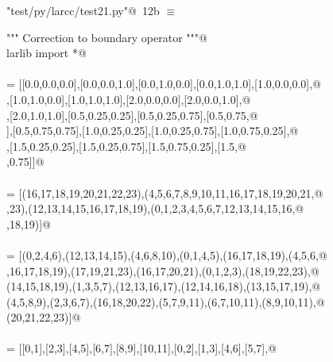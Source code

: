 \documentclass[11pt,oneside]{article}    %
\begin{document}
\begin{flushleft} \small \label{scrap21}
\protect{}\verb@"test/py/larcc/test21.py"@\nobreak\ {\footnotesize 12b }$\equiv$
\vspace{-1ex}
\begin{list}{}{} \item
\mbox{}\verb@""" Correction to boundary operator """@\\
\mbox{}\verb@from larlib import *@\\
\mbox{}\verb@@\\
\mbox{}\verb@V = [[0.0,0.0,0.0],[0.0,0.0,1.0],[0.0,1.0,0.0],[0.0,1.0,1.0],[1.0,0.0,0.0],@\\
\mbox{}\verb@[1.0,0.0,1.0],[1.0,1.0,0.0],[1.0,1.0,1.0],[2.0,0.0,0.0],[2.0,0.0,1.0],@\\
\mbox{}\verb@[2.0,1.0,0.0],[2.0,1.0,1.0],[0.5,0.25,0.25],[0.5,0.25,0.75],[0.5,0.75,@\\
\mbox{}],[0.5,0.75,0.75],[1.0,0.25,0.25],[1.0,0.25,0.75],[1.0,0.75,0.25],@\\
\mbox{}\verb@[1.0,0.75,0.75],[1.5,0.25,0.25],[1.5,0.25,0.75],[1.5,0.75,0.25],[1.5,@\\
\mbox{},0.75]]@\\
\mbox{}\verb@@\\
\mbox{}\verb@CV = [(16,17,18,19,20,21,22,23),(4,5,6,7,8,9,10,11,16,17,18,19,20,21,@\\
\mbox{},23),(12,13,14,15,16,17,18,19),(0,1,2,3,4,5,6,7,12,13,14,15,16,@\\
\mbox{},18,19)]@\\
\mbox{}\verb@@\\
\mbox{}\verb@FV = [(0,2,4,6),(12,13,14,15),(4,6,8,10),(0,1,4,5),(16,17,18,19),(4,5,6,@\\
\mbox{},16,17,18,19),(17,19,21,23),(16,17,20,21),(0,1,2,3),(18,19,22,23),@\\
\mbox{}\verb@(14,15,18,19),(1,3,5,7),(12,13,16,17),(12,14,16,18),(13,15,17,19),@\\
\mbox{}\verb@(4,5,8,9),(2,3,6,7),(16,18,20,22),(5,7,9,11),(6,7,10,11),(8,9,10,11),@\\
\mbox{}\verb@(20,21,22,23)]@\\
\mbox{}\verb@@\\
\mbox{}\verb@EV = [[0,1],[2,3],[4,5],[6,7],[8,9],[10,11],[0,2],[1,3],[4,6],[5,7],@\\

\end{list}
\end{flushleft}
\end{document}

